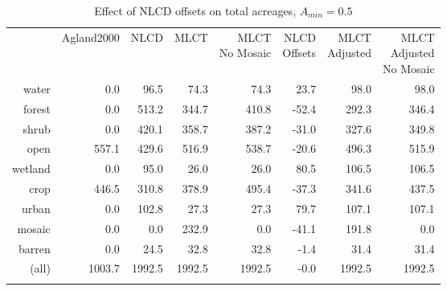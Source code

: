 \begin{table}[ht]
\begin{center}
{\small
\begin{tabular}{rrrrrrrr}
  \hline
 & Agland2000 & NLCD & MLCT & \pbox[c][][c]{3in}{MLCT\\No Mosaic} & \pbox[c][][c]{3in}{NLCD\\Offsets} & \pbox[c][][c]{3in}{MLCT\\Adjusted} & \pbox[c][][c]{3in}{\smallskip{}MLCT\\Adjusted\\No Mosaic} \\ 
  \noalign{\smallskip} \hline
water & 0.0 & 96.5 & 74.3 & 74.3 & 23.7 & 98.0 & 98.0 \\ 
  forest & 0.0 & 513.2 & 344.7 & 410.8 & -52.4 & 292.3 & 346.4 \\ 
  shrub & 0.0 & 420.1 & 358.7 & 387.2 & -31.0 & 327.6 & 349.8 \\ 
  open & 557.1 & 429.6 & 516.9 & 538.7 & -20.6 & 496.3 & 515.9 \\ 
  wetland & 0.0 & 95.0 & 26.0 & 26.0 & 80.5 & 106.5 & 106.5 \\ 
  crop & 446.5 & 310.8 & 378.9 & 495.4 & -37.3 & 341.6 & 437.5 \\ 
  urban & 0.0 & 102.8 & 27.3 & 27.3 & 79.7 & 107.1 & 107.1 \\ 
  mosaic & 0.0 & 0.0 & 232.9 & 0.0 & -41.1 & 191.8 & 0.0 \\ 
  barren & 0.0 & 24.5 & 32.8 & 32.8 & -1.4 & 31.4 & 31.4 \\ 
  (all) & 1003.7 & 1992.5 & 1992.5 & 1992.5 & -0.0 & 1992.5 & 1992.5 \\ 
   \noalign{\smallskip} \hline
\end{tabular}
}
\caption{Effect of NLCD offsets on total acreages, $A_{min}=0.5$}
\label{tab:areas2}
\end{center}
\end{table}



